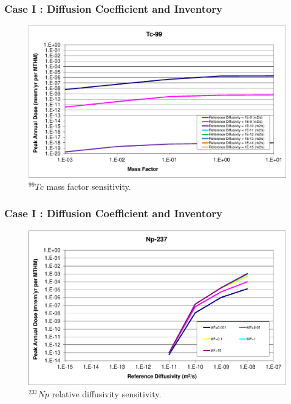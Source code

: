 \begin{frame}[c]
  \frametitle{Case I : Diffusion Coefficient and Inventory}

\begin{figure}[ht!]
\centering
\includegraphics[width=\linewidth]{DiffCoeffAndInvEBSFail/Tc-99-MF.eps}
\caption{$^{99}Tc$ mass factor sensitivity.}
\label{fig:DCInvTc99MF}
\end{figure}
\end{frame}

\begin{frame}[c]
  \frametitle{Case I : Diffusion Coefficient and Inventory}


\begin{figure}[ht!]
\centering
\includegraphics[width=\linewidth]{DiffCoeffAndInvEBSFail/Np-237.eps}
\caption{$^{237}Np$ relative diffusivity sensitivity.} 
\label{fig:DCInvNp237}
\end{figure}
\end{frame}


